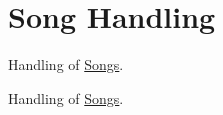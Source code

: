 \hypertarget{group___doc_song_handling}{}\section{Song Handling}
\label{group___doc_song_handling}


Handling of \hyperlink{class_song}{Songs}.  


Handling of \hyperlink{class_song}{Songs}. 

